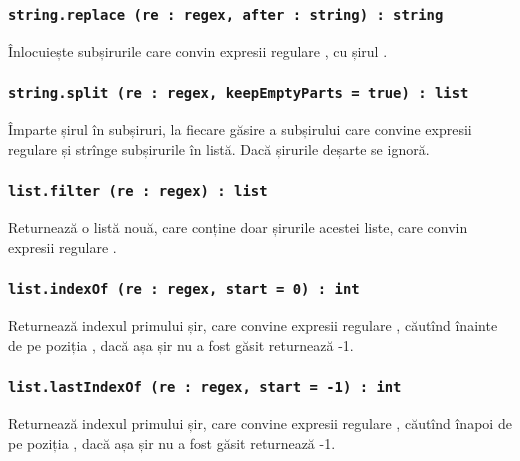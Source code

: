 \subsubsection{\lstinline|string.replace (re : regex, after : string) : string|}

Înlocuiește subșirurile care convin expresii regulare , cu șirul .

\subsubsection{\lstinline|string.split (re : regex, keepEmptyParts = true) : list|}

Împarte șirul în subșiruri, la fiecare găsire a subșirului care convine expresii regulare  și strînge subșirurile în listă. Dacă  șirurile deșarte se ignoră.

\subsubsection{\lstinline|list.filter (re : regex) : list|}

Returnează o listă nouă, care conține doar șirurile acestei liste, care convin expresii regulare .

\subsubsection{\lstinline|list.indexOf (re : regex, start = 0) : int|}

Returnează indexul primului șir, care convine expresii regulare , căutînd înainte de pe poziția , dacă așa șir nu a fost găsit returnează -1.

\subsubsection{\lstinline|list.lastIndexOf (re : regex, start = -1) : int|}

Returnează indexul primului șir, care convine expresii regulare , căutînd înapoi de pe poziția , dacă așa șir nu a fost găsit returnează -1.


